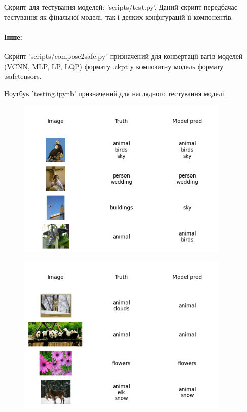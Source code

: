 \documentclass{udstu}
\begin{document}
Скрипт для тестування моделей: 'scripts/test.py'.
Даний скрипт передбачає тестування як фінальної моделі, так і деяких конфігурацій її компонентів.


\paragraph{\textbf{Інше:}\\}

Скрипт 'scripts/compose2safe.py' призначений для конвертації вагів моделей (VCNN, MLP, LP, LQP)
формату .ckpt у композитну модель формату .safetensors.

Ноутбук 'testing.ipynb' призначений для наглядного тестування моделі.



\begin{figure}[!ht]
	\centering
	\includegraphics[width=0.9\textwidth]{PNG/showcase-100}
	\caption{}
\end{figure}

\begin{figure}[!ht]
	\centering
	\includegraphics[width=0.9\textwidth]{PNG/showcase-125}
	\caption{}
\end{figure}
\end{document}
